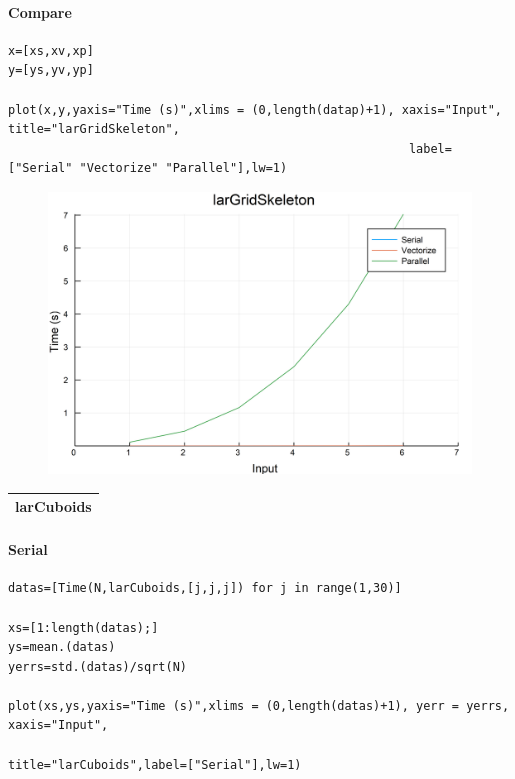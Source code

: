 \documentclass{article}
\begin{document}
\paragraph{Compare}
\begin{flushleft}\small
\begin{list}{}{} \item
    \begin{Verbatim}[tabsize=4]
x=[xs,xv,xp]
y=[ys,yv,yp]

plot(x,y,yaxis="Time (s)",xlims = (0,length(datap)+1), xaxis="Input", title="larGridSkeleton",
                                                        label=["Serial" "Vectorize" "Parallel"],lw=1)
    \end{Verbatim}
\end{list}
\end{flushleft}   
\begin{figure}[h!]
\centering
\includegraphics[scale=0.06]{larGridSkeletonCom.png}
\end{figure}
\newpage
\begin{tabular}{p{16cm}}
\hline
larCuboids\\
\hline
\end{tabular}

\paragraph{Serial}
\begin{flushleft}\small
\begin{list}{}{} \item
    \begin{Verbatim}[tabsize=4]
datas=[Time(N,larCuboids,[j,j,j]) for j in range(1,30)]

xs=[1:length(datas);]
ys=mean.(datas)
yerrs=std.(datas)/sqrt(N)

plot(xs,ys,yaxis="Time (s)",xlims = (0,length(datas)+1), yerr = yerrs, xaxis="Input", 
                                                title="larCuboids",label=["Serial"],lw=1)
    \end{Verbatim}
\end{list}
\end{flushleft} 
\end{document}
